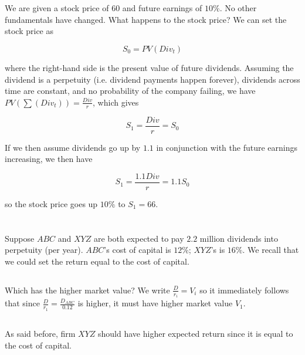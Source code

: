 \documentclass[12pt, letterpaper, parskip = full]{article}
\begin{document}
    \section{}

    We are given a stock price of \(60\) and future earnings of \(10\%\). No other fundamentals have changed. What happens to the stock price? We can set the stock price as 

    \[ S_0 = PV(Div_{t})  \]

    where the right-hand side is the present value of future dividends. Assuming the dividend is a perpetuity (i.e. dividend payments happen forever), dividends across time are constant,  and no probability of the company failing, we have \(PV(\sum(Div_t)) = \frac{Div}{r}\), which gives

    \[ S_1 = \frac{Div}{r} = S_0 \]

    If we then assume dividends go up by \(1.1\) in conjunction with the future earnings increasing, we then have 
     
    \[ S_1 = \frac{1.1 Div}{r} = 1.1 S_0  \]

    so the stock price goes up \(10\%\) to \(\boxed{S_1 = 66}\).

    \section{}

    Suppose \(ABC\) and \(XYZ\) are both expected to pay \(2.2\) million dividends into perpetuity (per year). \(ABC\)'s cost of capital is \(12\%\); \(XYZ\)'s is \(16\%\). We recall that we could set the return equal to the cost of capital.

    \subsection{}

    Which has the higher market value? We write 
    \(\frac{D}{r_i} = V_i\)
    so it immediately follows that since \(\frac{D}{r_1} = \frac{D_{ABC}}{0.12}\) is higher, it must have higher market value \(V_1\).

    \subsection{}

    As said before, firm \(XYZ\) should have higher expected return since it is equal to the cost of capital.
\end{document}
